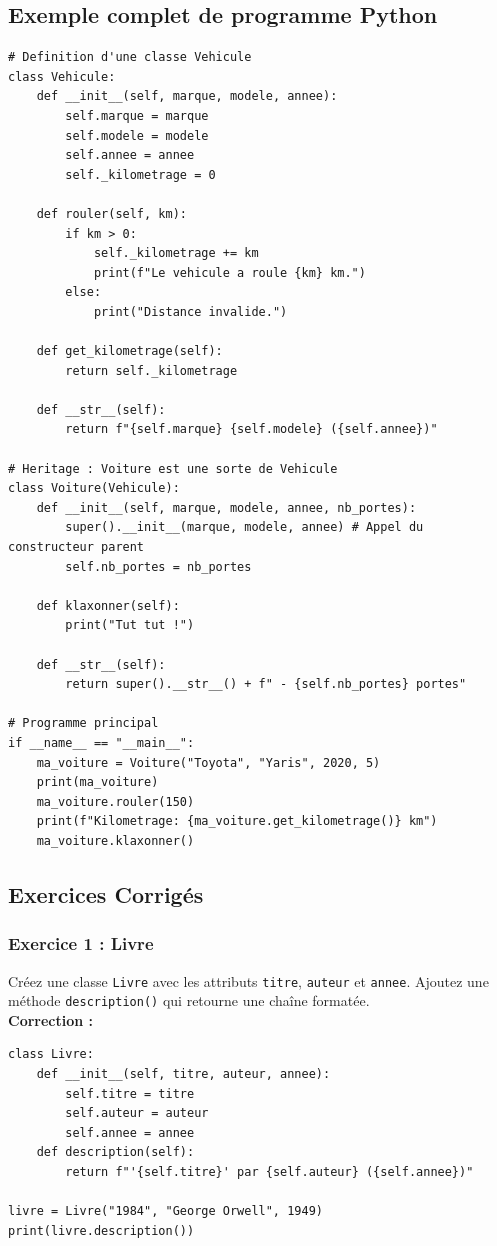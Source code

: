 \documentclass[a4paper,12pt]{article}
\begin{document}
\subsection{Exemple complet de programme Python}
\begin{lstlisting}
# Definition d'une classe Vehicule
class Vehicule:
    def __init__(self, marque, modele, annee):
        self.marque = marque
        self.modele = modele
        self.annee = annee
        self._kilometrage = 0

    def rouler(self, km):
        if km > 0:
            self._kilometrage += km
            print(f"Le vehicule a roule {km} km.")
        else:
            print("Distance invalide.")

    def get_kilometrage(self):
        return self._kilometrage

    def __str__(self):
        return f"{self.marque} {self.modele} ({self.annee})"

# Heritage : Voiture est une sorte de Vehicule
class Voiture(Vehicule):
    def __init__(self, marque, modele, annee, nb_portes):
        super().__init__(marque, modele, annee) # Appel du constructeur parent
        self.nb_portes = nb_portes

    def klaxonner(self):
        print("Tut tut !")

    def __str__(self):
        return super().__str__() + f" - {self.nb_portes} portes"

# Programme principal
if __name__ == "__main__":
    ma_voiture = Voiture("Toyota", "Yaris", 2020, 5)
    print(ma_voiture)
    ma_voiture.rouler(150)
    print(f"Kilometrage: {ma_voiture.get_kilometrage()} km")
    ma_voiture.klaxonner()
\end{lstlisting}

\subsection{Exercices Corrigés}
\subsubsection{Exercice 1 : Livre}
Créez une classe \texttt{Livre} avec les attributs \texttt{titre}, \texttt{auteur} et \texttt{annee}. Ajoutez une méthode \texttt{description()} qui retourne une chaîne formatée.
\\[0.5cm]
\textbf{Correction :}
\begin{lstlisting}
class Livre:
    def __init__(self, titre, auteur, annee):
        self.titre = titre
        self.auteur = auteur
        self.annee = annee
    def description(self):
        return f"'{self.titre}' par {self.auteur} ({self.annee})"

livre = Livre("1984", "George Orwell", 1949)
print(livre.description())
\end{lstlisting}
\end{document}
